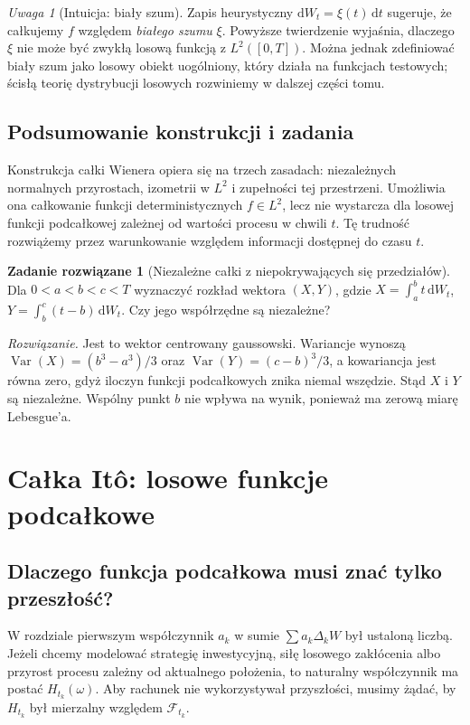 \documentclass[11pt,a4paper,oneside]{report}
\numberwithin{equation}{chapter}
\theoremstyle{plain}
\theoremstyle{definition}
\newtheorem{zadanie}{Zadanie rozwiązane}[chapter]
\theoremstyle{remark}
\newtheorem{uwaga}{Uwaga}[chapter]
\newcommand{\Var}{\operatorname{Var}}
\newcommand{\calF}{\mathcal{F}}
\newcommand{\dd}{\mathrm{d}}
\begin{document}
\begin{uwaga}[Intuicja: biały szum]
Zapis heurystyczny $\dd W_t=\xi(t)\,\dd t$ sugeruje,
że całkujemy $f$ względem \emph{białego szumu} $\xi$.
Powyższe twierdzenie wyjaśnia, dlaczego $\xi$ nie może
być zwykłą losową funkcją z $L^2([0,T])$. Można jednak
zdefiniować biały szum jako losowy obiekt uogólniony,
który działa na funkcjach testowych; ścisłą teorię
dystrybucji losowych rozwiniemy w dalszej części tomu.
\end{uwaga}

\section{Podsumowanie konstrukcji i zadania}
Konstrukcja całki Wienera opiera się na trzech zasadach:
niezależnych normalnych przyrostach, izometrii w $L^2$
i zupełności tej przestrzeni. Umożliwia ona całkowanie
funkcji deterministycznych $f\in L^2$, lecz nie wystarcza
dla losowej funkcji podcałkowej zależnej od wartości
procesu w chwili $t$. Tę trudność rozwiążemy przez
warunkowanie względem informacji dostępnej do czasu $t$.

\begin{zadanie}[Niezależne całki z niepokrywających się przedziałów]
Dla $0<a<b<c<T$ wyznaczyć rozkład wektora
$(X,Y)$, gdzie $X=\int_a^b t\,\dd W_t$,
$Y=\int_b^c (t-b)\,\dd W_t$. Czy jego współrzędne
są niezależne?

\emph{Rozwiązanie.} Jest to wektor centrowany gaussowski.
Wariancje wynoszą $\Var(X)=(b^3-a^3)/3$ oraz
$\Var(Y)=(c-b)^3/3$, a kowariancja jest równa zero,
gdyż iloczyn funkcji podcałkowych znika niemal wszędzie.
Stąd $X$ i $Y$ są niezależne. Wspólny punkt $b$ nie
wpływa na wynik, ponieważ ma zerową miarę Lebesgue'a.
\end{zadanie}

\chapter{Całka Itô: losowe funkcje podcałkowe}
\label{ch:ito-construction}
\section{Dlaczego funkcja podcałkowa musi znać tylko przeszłość?}
W rozdziale pierwszym współczynnik $a_k$ w sumie
$\sum a_k\Delta_kW$ był ustaloną liczbą. Jeżeli chcemy
modelować strategię inwestycyjną, siłę losowego zakłócenia
albo przyrost procesu zależny od aktualnego położenia,
to naturalny współczynnik ma postać $H_{t_k}(\omega)$.
Aby rachunek nie wykorzystywał przyszłości, musimy żądać,
by $H_{t_k}$ był mierzalny względem $\calF_{t_k}$.
\end{document}
